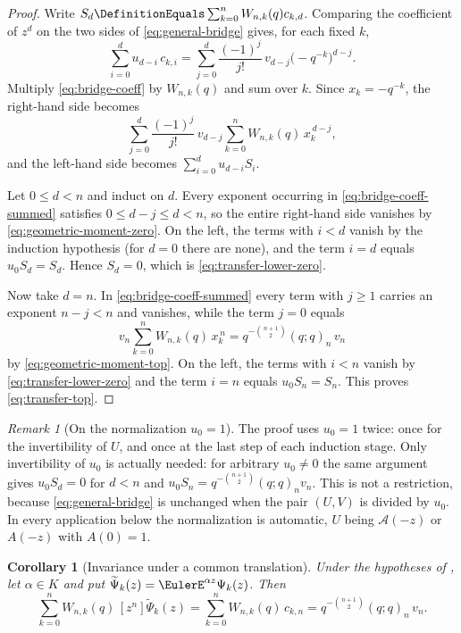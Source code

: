 \documentclass[11pt,a4paper,oneside,openany]{book}
\newtheorem{corollary}[corollary]{Corollary}
\theoremstyle{definition}
\theoremstyle{remark}
\newtheorem{remark}[remark]{Remark}
\begin{document}
\begin{proof}
Write $S_d\DefinitionEquals\sum_{k=0}^{n}W_{n,k}(q)c_{k,d}$.  Comparing the coefficient of $z^d$ on the two sides of \eqref{eq:general-bridge} gives, for each fixed $k$,
\begin{equation}\label{eq:bridge-coeff}
 \sum_{i=0}^{d}u_{d-i}\,c_{k,i}
 =\sum_{j=0}^{d}\frac{(-1)^j}{j!}\,v_{d-j}\bigl(-q^{-k}\bigr)^{d-j}.
\end{equation}
Multiply \eqref{eq:bridge-coeff} by $W_{n,k}(q)$ and sum over $k$.  Since $x_k=-q^{-k}$, the right-hand side becomes
\begin{equation}\label{eq:bridge-coeff-summed}
 \sum_{j=0}^{d}\frac{(-1)^j}{j!}\,v_{d-j}
 \sum_{k=0}^{n}W_{n,k}(q)\,x_k^{\,d-j},
\end{equation}
and the left-hand side becomes $\sum_{i=0}^{d}u_{d-i}S_i$.

Let $0\le d<n$ and induct on $d$.  Every exponent occurring in \eqref{eq:bridge-coeff-summed} satisfies $0\le d-j\le d<n$, so the entire right-hand side vanishes by \eqref{eq:geometric-moment-zero}.  On the left, the terms with $i<d$ vanish by the induction hypothesis (for $d=0$ there are none), and the term $i=d$ equals $u_0S_d=S_d$.  Hence $S_d=0$, which is \eqref{eq:transfer-lower-zero}.

Now take $d=n$.  In \eqref{eq:bridge-coeff-summed} every term with $j\ge1$ carries an exponent $n-j<n$ and vanishes, while the term $j=0$ equals
\[
 v_n\sum_{k=0}^{n}W_{n,k}(q)\,x_k^{\,n}
 =q^{-\binom{n+1}{2}}(q;q)_n\,v_n
\]
by \eqref{eq:geometric-moment-top}.  On the left, the terms with $i<n$ vanish by \eqref{eq:transfer-lower-zero} and the term $i=n$ equals $u_0S_n=S_n$.  This proves \eqref{eq:transfer-top}.
\end{proof}

\begin{remark}[On the normalization $u_0=1$]\label{rem:transfer-normalization}
The proof uses $u_0=1$ twice: once for the invertibility of $U$, and once at the last step of each induction stage.  Only invertibility of $u_0$ is actually needed: for arbitrary $u_0\ne0$ the same argument gives $u_0S_d=0$ for $d<n$ and $u_0S_n=q^{-\binom{n+1}{2}}(q;q)_nv_n$.  This is not a restriction, because \eqref{eq:general-bridge} is unchanged when the pair $(U,V)$ is divided by $u_0$.  In every application below the normalization is automatic, $U$ being $\mathcal A(-z)$ or $A(-z)$ with $A(0)=1$.
\end{remark}

\begin{corollary}[Invariance under a common translation]\label{cor:transfer-translation}
Under the hypotheses of , let $\alpha\in K$ and put $\widetilde\Psi_k(z)=\EulerE^{\alpha z}\Psi_k(z)$.  Then
\begin{equation}\label{eq:transfer-translation-invariance}
 \sum_{k=0}^{n}W_{n,k}(q)\,[z^n]\widetilde\Psi_k(z)
 =\sum_{k=0}^{n}W_{n,k}(q)\,c_{k,n}
 =q^{-\binom{n+1}{2}}(q;q)_n\,v_n .
\end{equation}
\end{corollary}
\end{document}
